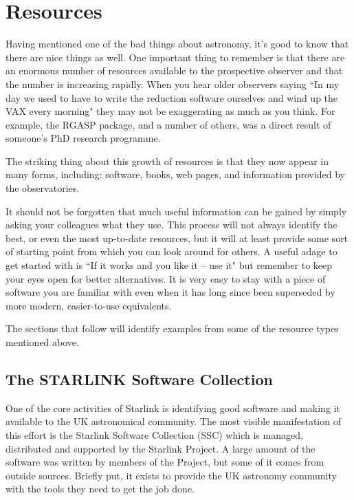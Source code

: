 \documentclass[twoside,11pt]{article}
\newcommand{\htmladdnormallink}[2]{#1}
\newcommand{\xref}[3]{#1}
\newcommand{\xlabel}[1]{}
\newcommand{\STARLINKref}{\htmladdnormallink{Starlink}{http://www.starlink.ac.uk/}}
\newcommand{\SSCref}{\xref{SSC}{sun1}{}}
\begin{document}
\section{Resources} \xlabel{RESOURCES}
\label{sec:resources}

Having mentioned one of the bad things about astronomy, it's good to know that
there are nice things as well. One important thing to remember is that there
are an enormous number of resources available to the prospective observer and
that the number is increasing rapidly. When you hear older observers saying
``In my day we used to have to write the reduction software ourselves and wind
up the VAX every morning" they may not be exaggerating as much as you think.
For example, the RGASP package, and a number of others, was a direct result of
someone's PhD research programme.

The striking thing about this growth of resources is that they now appear in
many forms, including: software, books, web pages, and information provided by
the observatories.

It should not be forgotten that much useful information can be gained by
simply asking your colleagues what they use. This process will not always
identify the best, or even the most up-to-date resources, but it will at
least provide some sort of starting point from which you can look around for
others. A useful adage to get started with is ``If it works and you like it --
use it" but remember to keep your eyes open for better alternatives. It is
very easy to stay with a piece of software you are familiar with even when it
has long since been superseded by more modern, easier-to-use equivalents.

The sections that follow will identify examples from some of the
resource types mentioned above.


\subsection{The STARLINK Software Collection} \xlabel{STARLINK}
\label{sec:starlink}

One of the core activities of {\STARLINKref} is identifying
good software and making it available to the UK astronomical
community. The most visible manifestation of this
effort is the Starlink Software Collection ({\SSCref}) which is managed,
distributed and supported by the Starlink Project. A large amount of the
software was written by members of the Project, but some of it comes from
outside sources. Briefly put, it exists to provide the UK astronomy
community with the tools they need to get the job done.
\end{document}
